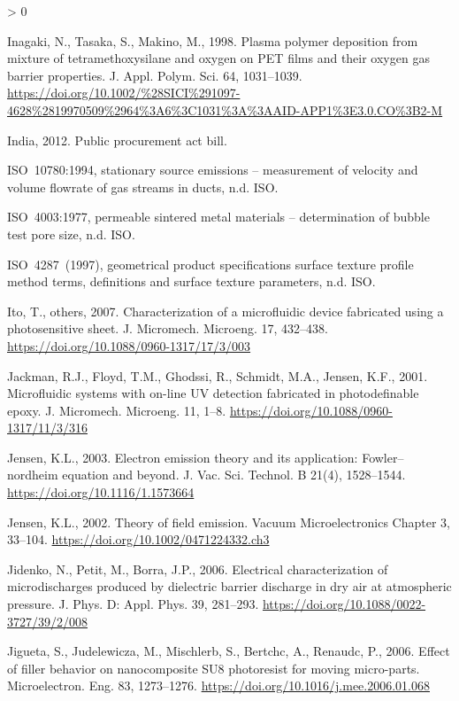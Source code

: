 \documentclass[
  11pt,
  twoside]{article}
\newlength{\cslhangindent}
\newenvironment{CSLReferences}[2] %
 {%
  \setlength{\parindent}{0pt}
  \ifodd #1 \everypar{\setlength{\hangindent}{\cslhangindent}}\ignorespaces\fi
  \ifnum #2 > 0
  \setlength{\parskip}{#2\baselineskip}
  \fi
 }%
 {}
\begin{document}
\begin{CSLReferences}{1}{0}
\leavevmode\hypertarget{ref-Inag1998}{}%
Inagaki, N., Tasaka, S., Makino, M., 1998. Plasma polymer deposition from mixture of tetramethoxysilane and oxygen on {PET} films and their oxygen gas barrier properties. J. Appl. Polym. Sci. 64, 1031--1039. \url{https://doi.org/10.1002/\%28SICI\%291097-4628\%2819970509\%2964\%3A6\%3C1031\%3A\%3AAID-APP1\%3E3.0.CO\%3B2-M}

\leavevmode\hypertarget{ref-publicprocurementact}{}%
India, 2012. Public procurement act bill.

\leavevmode\hypertarget{ref-ISO10780}{}%
{ISO}~10780:1994, stationary source emissions -- measurement of velocity and volume flowrate of gas streams in ducts, n.d. ISO.

\leavevmode\hypertarget{ref-ISO4003}{}%
{ISO}~4003:1977, permeable sintered metal materials -- determination of bubble test pore size, n.d. ISO.

\leavevmode\hypertarget{ref-ISO4287}{}%
{ISO}~4287~(1997), geometrical product specifications surface texture profile method terms, definitions and surface texture parameters, n.d. ISO.

\leavevmode\hypertarget{ref-Ito07}{}%
Ito, T., others, 2007. Characterization of a microfluidic device fabricated using a photosensitive sheet. J. Micromech. Microeng. 17, 432--438. \url{https://doi.org/10.1088/0960-1317/17/3/003}

\leavevmode\hypertarget{ref-Jack01}{}%
Jackman, R.J., Floyd, T.M., Ghodssi, R., Schmidt, M.A., Jensen, K.F., 2001. Microfluidic systems with on-line UV detection fabricated in photodefinable epoxy. J. Micromech. Microeng. 11, 1--8. \url{https://doi.org/10.1088/0960-1317/11/3/316}

\leavevmode\hypertarget{ref-Jens03}{}%
Jensen, K.L., 2003. Electron emission theory and its application: Fowler--nordheim equation and beyond. J. Vac. Sci. Technol. B 21(4), 1528--1544. \url{https://doi.org/10.1116/1.1573664}

\leavevmode\hypertarget{ref-Jens02}{}%
Jensen, K.L., 2002. Theory of field emission. Vacuum Microelectronics Chapter 3, 33--104. \url{https://doi.org/10.1002/0471224332.ch3}

\leavevmode\hypertarget{ref-Jide06}{}%
Jidenko, N., Petit, M., Borra, J.P., 2006. Electrical characterization of microdischarges produced by dielectric barrier discharge in dry air at atmospheric pressure. J. Phys. D: Appl. Phys. 39, 281--293. \url{https://doi.org/10.1088/0022-3727/39/2/008}

\leavevmode\hypertarget{ref-Jigu06}{}%
Jigueta, S., Judelewicza, M., Mischlerb, S., Bertchc, A., Renaudc, P., 2006. Effect of filler behavior on nanocomposite {SU8} photoresist for moving micro-parts. Microelectron. Eng. 83, 1273--1276. \url{https://doi.org/10.1016/j.mee.2006.01.068}


\end{CSLReferences}
\end{document}
